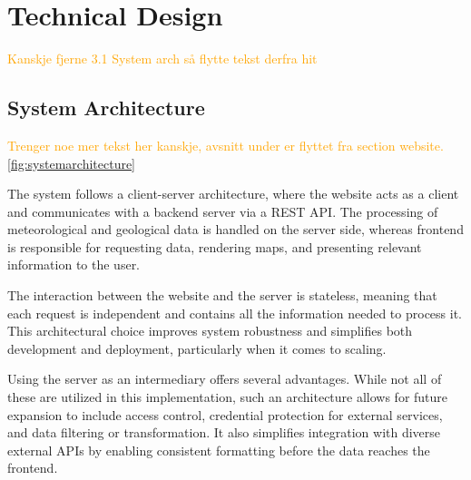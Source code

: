 \chapter{Technical Design}\label{chap:technicaldesign}

\textcolor{orange}{
Kanskje fjerne 3.1 System arch så flytte tekst derfra hit
}

\section{System Architecture}\label{sec:systemarchitecture}

\textcolor{orange}{
Trenger noe mer tekst her kanskje, avsnitt under er flyttet fra section website. \autoref{fig:systemarchitecture}
}

The system follows a client-server architecture, where the website acts as a client and communicates with a backend server via a REST API. The processing of meteorological and geological data is handled on the server side, whereas frontend is responsible for requesting data, rendering maps, and presenting relevant information to the user.

The interaction between the website and the server is stateless, meaning that each request is independent and contains all the information needed to process it. This architectural choice improves system robustness and simplifies both development and deployment, particularly when it comes to scaling.

Using the server as an intermediary offers several advantages. While not all of these are utilized in this implementation, such an architecture allows for future expansion to include access control, credential protection for external services, and data filtering or transformation. It also simplifies integration with diverse external APIs by enabling consistent formatting before the data reaches the frontend.

